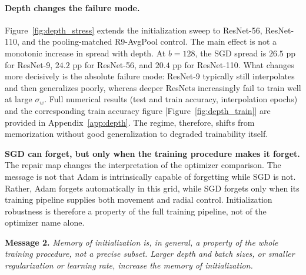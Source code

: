 \documentclass{article}
\begin{document}
\paragraph{Depth changes the failure mode.}
Figure~\ref{fig:depth_stress} extends the initialization sweep to ResNet-56, ResNet-110, and the pooling-matched R9-AvgPool control. The main effect is not a monotonic increase in spread with depth. At $b=128$, the SGD spread is $26.5$ pp for ResNet-9, $24.2$ pp for ResNet-56, and $20.4$ pp for ResNet-110.
What changes more decisively is the absolute failure mode: ResNet-9 typically still interpolates and then generalizes poorly, whereas deeper ResNets increasingly fail to train well at large $\sigma_w$. Full numerical results (test and train accuracy, interpolation epochs) and the corresponding train accuracy figure [Figure~\ref{fig:depth_train}] are provided in  Appendix~\ref{app:depth}. The regime, therefore, shifts from memorization without good generalization to degraded trainability itself.


\textbf{SGD can forget, but only when the training procedure makes it forget.} The repair map changes the interpretation of the optimizer comparison.  The message is not that Adam is intrinsically capable of forgetting while SGD is not.  Rather, Adam forgets automatically in this grid, while SGD forgets only when its training pipeline supplies both movement and radial control.  Initialization robustness is therefore a property of the full training pipeline, not of the optimizer name alone.



\begin{summarybox}
\textbf{Message 2.}
\textit{Memory of initialization is, in general, a property of the whole training procedure, not a precise subset. Larger depth and batch sizes, or smaller regularization or learning rate, increase the memory of initialization.}
\end{summarybox}
\end{document}
